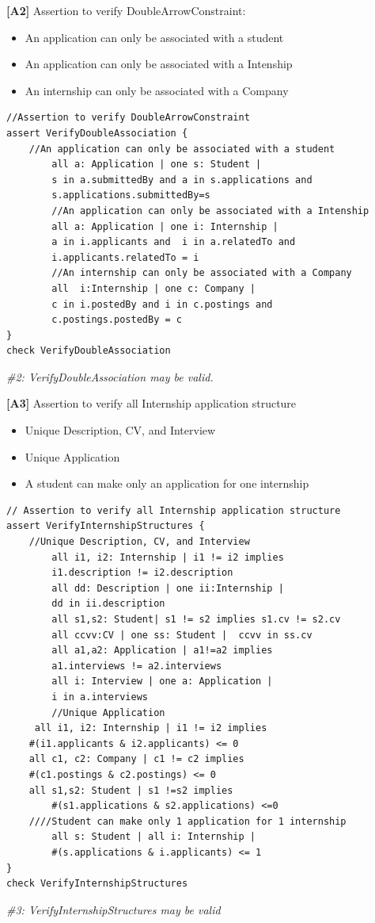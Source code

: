\textbf{[A2]} Assertion to verify DoubleArrowConstraint:
\begin{itemize}
    \item An application can only be associated with a student
    \item An application can only be associated with a Intenship
    \item An internship can only be associated with a Company
\end{itemize}
\begin{lstlisting}
//Assertion to verify DoubleArrowConstraint
assert VerifyDoubleAssociation {
	//An application can only be associated with a student
    	all a: Application | one s: Student | 
    	s in a.submittedBy and a in s.applications and
    	s.applications.submittedBy=s
    	//An application can only be associated with a Intenship
    	all a: Application | one i: Internship | 
    	a in i.applicants and  i in a.relatedTo and
    	i.applicants.relatedTo = i
    	//An internship can only be associated with a Company
    	all  i:Internship | one c: Company | 
    	c in i.postedBy and i in c.postings and 
    	c.postings.postedBy = c  
}
check VerifyDoubleAssociation
\end{lstlisting}
\textit{\#2: VerifyDoubleAssociation may be valid.}


\textbf{[A3]} Assertion to verify all Internship application structure
\begin{itemize}
    \item Unique Description, CV, and Interview 
    \item Unique Application
    \item A student can make only an application for one internship
\end{itemize}
\begin{lstlisting}
// Assertion to verify all Internship application structure
assert VerifyInternshipStructures {
	//Unique Description, CV, and Interview 
    	all i1, i2: Internship | i1 != i2 implies 
		i1.description != i2.description
    	all dd: Description | one ii:Internship | 
		dd in ii.description
    	all s1,s2: Student| s1 != s2 implies s1.cv != s2.cv
    	all ccvv:CV | one ss: Student |  ccvv in ss.cv
    	all a1,a2: Application | a1!=a2 implies 
		a1.interviews != a2.interviews
    	all i: Interview | one a: Application |
		i in a.interviews
    	//Unique Application
   	 all i1, i2: Internship | i1 != i2 implies 
   	#(i1.applicants & i2.applicants) <= 0
   	all c1, c2: Company | c1 != c2 implies 
   	#(c1.postings & c2.postings) <= 0
   	all s1,s2: Student | s1 !=s2 implies 
    	#(s1.applications & s2.applications) <=0
   	////Student can make only 1 application for 1 internship
    	all s: Student | all i: Internship | 
    	#(s.applications & i.applicants) <= 1
}
check VerifyInternshipStructures
\end{lstlisting}
\textit{\#3: VerifyInternshipStructures may be valid}


